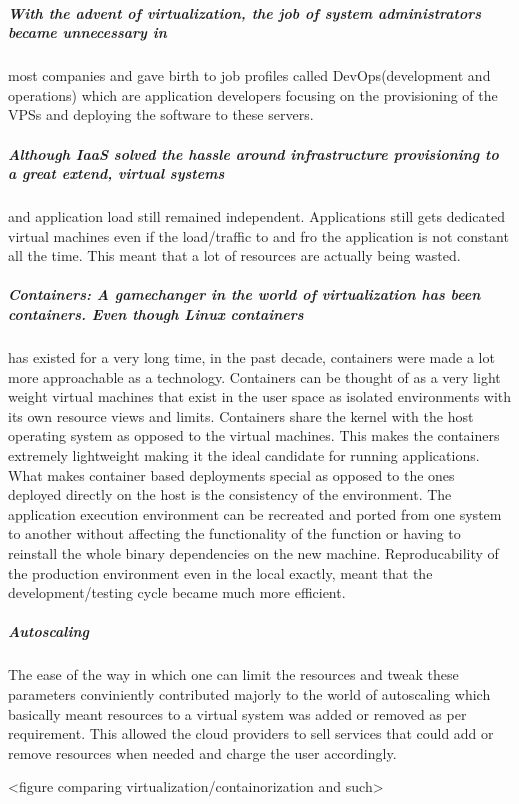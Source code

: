 \documentclass[12pt]{article}
\begin{document}
\subparagraph{With the advent of virtualization, the job of system administrators became unnecessary in}
\label{sec:orgbdd6794}
most companies and gave birth to job profiles called DevOps(development and
operations) which are application developers focusing on the provisioning of the
VPSs and deploying the software to these servers.
\subparagraph{Although IaaS solved the hassle around infrastructure provisioning to a great extend, virtual systems}
\label{sec:org9d31240}
and application load still remained independent. Applications still gets dedicated virtual machines
even if the load/traffic to and fro the application is not constant all the time. This meant that a
lot of resources are actually being wasted.
\subparagraph{Containers: A gamechanger in the world of virtualization has been containers. Even though Linux containers}
\label{sec:orgbd91ee0}
has existed for a very long time, in the past decade, containers were made a lot more approachable as a
technology. Containers can be thought of as a very light weight virtual machines that exist in the user space
as isolated environments with its own resource views and limits. Containers share the kernel with the host
operating system as opposed to the virtual machines. This makes the containers extremely lightweight
making it the ideal candidate for running applications. What makes container based deployments special
as opposed to the ones deployed directly on the host is the consistency of the environment. The application
execution environment can be recreated and ported from one system to another without affecting the functionality
of the function or having to reinstall the whole binary dependencies on the new machine. Reproducability of the
production environment even in the local exactly, meant that the development/testing cycle became much more efficient.
\subparagraph{Autoscaling}
\label{sec:org2b621e6}
The ease of the way in which one can limit the resources and tweak these parameters conviniently contributed majorly
to the world of autoscaling which basically meant resources to a virtual system was added or removed as per requirement.
This allowed the cloud providers to sell services that could add or remove resources when needed and charge the
user accordingly.

<figure comparing virtualization/containorization and such>
\end{document}
